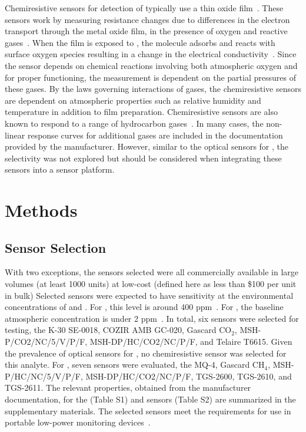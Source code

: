 \documentclass[sensors,article,submit,moreauthors,pdftex]{Definitions/mdpi}
\begin{document}
		Chemiresistive sensors for detection of  typically use a thin oxide film~\cite{neri_first_2015}.
		These sensors work by measuring resistance changes due to differences in the electron transport through the metal oxide film, in the presence of oxygen and reactive gases~\cite{albert_cross-reactive_2000}.
		When the film is exposed to , the molecule adsorbs and reacts with surface oxygen species resulting in a change in the electrical conductivity~\cite{wang_metal_2010,prudenziati_thick-film_1986}.
		Since the sensor depends on chemical reactions involving both atmospheric oxygen and  for proper functioning, the measurement is dependent on the partial pressures of these gases.
		By the laws governing interactions of gases, the chemiresistive sensors are dependent on atmospheric properties such as relative humidity and temperature in addition to film preparation.
		Chemiresistive sensors are also known to respond to a range of hydrocarbon gases~\cite{sekhar_development_2016}.
		In many cases, the non-linear response curves for additional gases are included in the documentation provided by the manufacturer.
		However, similar to the optical sensors for , the selectivity was not explored but should be considered when integrating these sensors into a sensor platform.
		
		
	\section{Methods}
		\label{sec:methods}
		
		\subsection{Sensor Selection}

			With two exceptions, the sensors selected were all commercially available in large volumes (at least 1000 units) at low-cost (defined here as less than \$100 per unit in bulk)
			Selected sensors were expected to have sensitivity at the environmental concentrations of  and .
			For , this level is around 400 ppm~\cite{blasing_recent_2016,dlugokencky_trends_2016}.
			For , the baseline atmospheric concentration is under 2 ppm~\cite{turner_large_2016,bamberger_spatial_2014,dlugokencky_trends_2016-1}.
			In total, six  sensors were selected for testing, the K-30 SE-0018, COZIR AMB GC-020, Gascard CO$_{2}$, MSH-P/CO2/NC/5/V/P/F, MSH-DP/HC/CO2/NC/P/F, and Telaire T6615.
			Given the prevalence of optical sensors for , no chemiresistive sensor was selected for this analyte.
			For , seven sensors were evaluated, the MQ-4, Gascard CH$_{4}$, MSH-P/HC/NC/5/V/P/F, MSH-DP/HC/CO2/NC/P/F, TGS-2600, TGS-2610, and TGS-2611.
			The relevant properties, obtained from the manufacturer documentation, for the  (Table S1) and  sensors (Table S2) are summarized in the supplementary materials.
			The selected sensors meet the requirements for use in portable low-power monitoring devices~\cite{karpov_energy_2013}.
			
\end{document}
